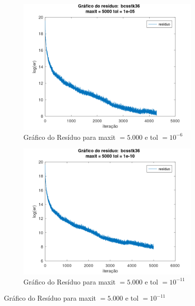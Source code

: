 \begin{figure}[H]
    \centering
    \begin{subfigure}[t]{0.4\linewidth}
         \centering
         \includegraphics[width=\textwidth]{image/bcsstk36_5000_-6.png}
         \caption{Gráfico do Resíduo para maxit $= 5.000$ e tol $=10^{-6}$}
         \label{fig:bcsstk36-5-6}
    \end{subfigure}
    \quad
    \begin{subfigure}[t]{0.4\linewidth}
         \centering
         \includegraphics[width=\textwidth]{image/bcsstk36_5000_-11.png}
         \caption{Gráfico do Resíduo para maxit $= 5.000$ e tol $=10^{-11}$}
         \label{fig:bcsstk36-5-11}
    \end{subfigure}

\end{figure}
